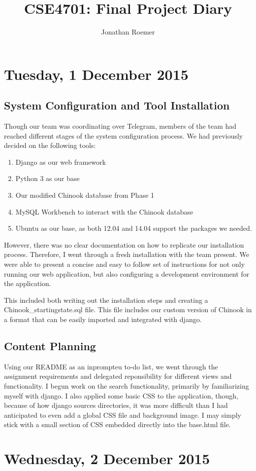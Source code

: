 \documentclass[a4paper,12pt]{article}
\begin{document}
\title{CSE4701: Final Project Diary}
\date{}
\author{Jonathan Roemer}
\maketitle

\section{Tuesday, 1 December 2015}
\subsection{System Configuration and Tool Installation}
Though our team was coordinating over Telegram, members of the team had reached
different stages of the system configuration process. We had previously decided
on the following tools:
\begin{enumerate}
	\item Django as our web framework
	\item Python 3 as our base
	\item Our modified Chinook database from Phase 1
	\item MySQL Workbench to interact with the Chinook database
	\item Ubuntu as our base, as both 12.04 and 14.04 support the packages we 
		needed.
\end{enumerate}

However, there was no clear documentation on how to replicate our installation
process. Therefore, I went through a fresh installation with the team present.
We were able to present a concise and easy to follow set of instructions for
not only running our web application, but also configuring a development
environment for the application.

This included both writing out the installation steps and creating a
Chinook_startingstate.sql file. This file includes our custom version of Chinook
in a format that can be easily imported and integrated with django.

\subsection{Content Planning}
Using our README as an inprompteu to-do list, we went through the assignment
requirements and delegated reponsibility for different views and functionality.
I begun work on the search functionality, primarily by familiarizing myself with
django. I also applied some basic CSS to the application, though, because of how
django sources directories, it was more difficult than I had anticipated to even
add a global CSS file and background image. I may simply stick with a small
section of CSS embedded directly into the base.html file.

\section{Wednesday, 2 December 2015}
\end{document}
